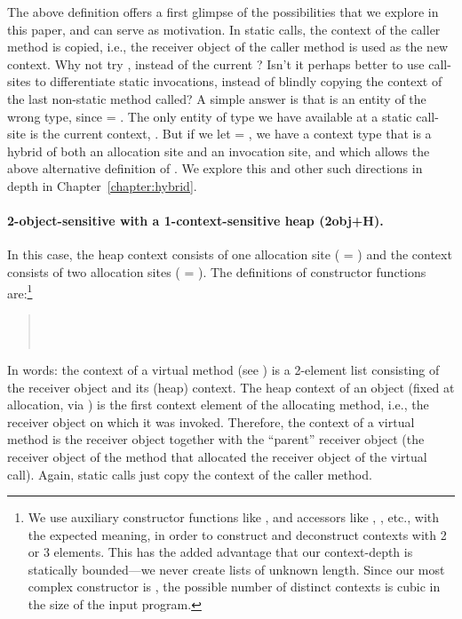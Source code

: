 The above definition offers a first glimpse of the possibilities that we explore in this paper, and can serve as motivation. In static calls, the context of the caller method is copied, i.e., the receiver object of the caller method is used as the new context. Why not try , instead of the current ? Isn't it perhaps better to use call-sites to differentiate static invocations, instead of blindly copying the context of the last non-static method called? A simple answer is that  is an entity of the wrong type, since  = . The only entity of type  we have available at a static call-site is the current context, . But if we let  = , we have a context type that is a hybrid of both an allocation site and an invocation site, and which allows the above alternative definition of . We explore this and other such directions in depth in Chapter~\ref{chapter:hybrid}.

\paragraph*{2-object-sensitive with a 1-context-sensitive heap (2obj+H).}
In this case, the heap context consists of one allocation site ( = ) and the context consists of two allocation sites ( = ). The definitions of constructor functions are:\footnote{We use auxiliary constructor functions like ,  and accessors like , , etc., with the expected meaning, in order to construct and deconstruct contexts with 2 or 3 elements. This has the added advantage that our context-depth is statically bounded---we never create lists of unknown length. Since our most complex constructor is , the possible number of distinct contexts is cubic in the size of the input program.}

\begin{quote}
 \\
 \\
\end{quote}

In words: the context of a virtual method (see ) is a 2-element list consisting of the receiver object and its (heap) context. The heap context of an object (fixed at allocation, via ) is the first context element of the allocating method, i.e., the receiver object on which it was invoked. Therefore, the context of a virtual method is the receiver object together with the ``parent'' receiver object (the receiver object of the method that allocated the receiver object of the virtual call). Again, static calls just copy the context of the caller method.

